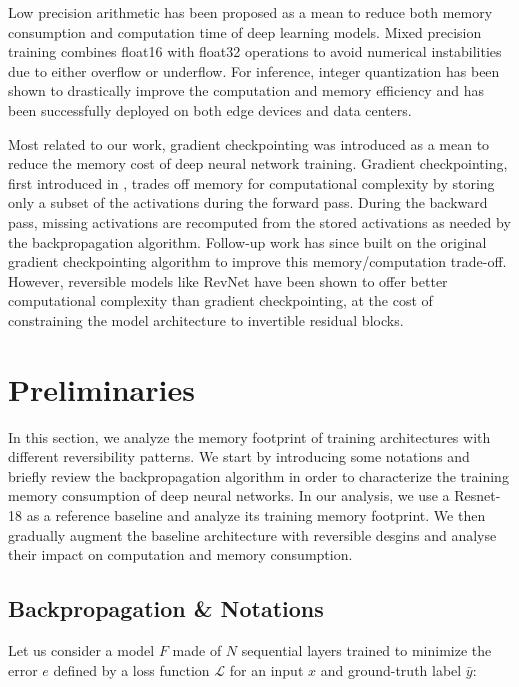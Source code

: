\documentclass[twocolumn]{bmcart}
\begin{document}
Low precision arithmetic has been proposed as a mean to reduce both memory consumption and computation time of deep learning models. Mixed precision training \cite{micikevicius2017mixed} combines float16 with float32 operations to avoid numerical instabilities due to either overflow or underflow.
For inference,  integer quantization \cite{jacob2018quantization,wu2018training} has been shown to drastically improve the computation and memory efficiency and has been successfully deployed on both edge devices and data centers.

Most related to our work, gradient checkpointing was introduced as a mean to reduce the memory cost of deep neural network training.
Gradient checkpointing, first introduced in \cite{martens2012training}, trades off memory for computational complexity by storing only a subset of the activations during the forward pass.
During the backward pass, missing activations are recomputed from the stored activations as needed by the backpropagation algorithm.
Follow-up work \cite{chen2016training} has since built on the original gradient checkpointing algorithm to improve this memory/computation trade-off.  
However, reversible models like RevNet have been shown to offer better computational complexity than gradient checkpointing,
at the cost of constraining the model architecture to invertible residual blocks.

\section{Preliminaries}

In this section, we analyze the memory footprint of training architectures with different reversibility patterns.
We start by introducing some notations and briefly review the backpropagation algorithm
in order to characterize the training memory consumption of deep neural networks. 
In our analysis, we use a Resnet-18 as a reference baseline and analyze its training memory footprint.
We then gradually augment the baseline architecture with reversible desgins and analyse their impact on computation and memory consumption.

\subsection{Backpropagation \& Notations}

Let us consider a model $F$ made of $N$ sequential layers trained to minimize the error $e$ defined by a loss function $\mathcal{L}$ for an input $x$ and ground-truth label $\bar{y}$:
\end{document}

